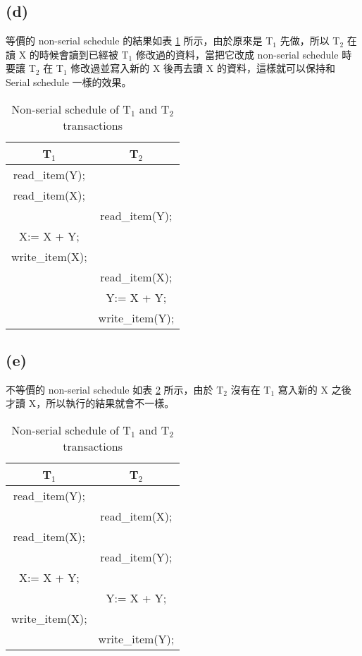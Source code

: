 \documentclass{article}
\begin{document}
\subsection*{(d)}
等價的 non-serial schedule 的結果如表 \ref{tab:2_d} 所示，由於原來是 T$_1$ 先做，所以 T$_2$ 在讀 X 的時候會讀到已經被 T$_1$ 修改過的資料，當把它改成 non-serial schedule 時要讓 T$_2$ 在 T$_1$ 修改過並寫入新的 X 後再去讀 X 的資料，這樣就可以保持和 Serial schedule 一樣的效果。
\begin{table}[H]
    \centering
    \begin{tabular}{|c|c|}
    \toprule
    \textbf{T$_1$} & \textbf{T$_2$} \\
    \midrule
    read\_item(Y); &  \\
    read\_item(X); & \\
     & read\_item(Y); \\
    X:= X + Y; &  \\
    write\_item(X); & \\
     & read\_item(X); \\
     & Y:= X + Y; \\
     & write\_item(Y); \\
    \bottomrule
    \end{tabular}
    \caption{Non-serial schedule of T$_1$ and T$_2$ transactions}
    \label{tab:2_d}
\end{table}


\subsection*{(e)}
不等價的 non-serial schedule 如表 \ref{tab:2_e} 所示，由於 T$_2$ 沒有在 T$_1$ 寫入新的 X 之後才讀 X，所以執行的結果就會不一樣。
\begin{table}[H]
    \centering
    \begin{tabular}{|c|c|}
    \toprule
    \textbf{T$_1$} & \textbf{T$_2$} \\
    \midrule
    read\_item(Y); &  \\
    & read\_item(X); \\
    read\_item(X); &  \\
    & read\_item(Y); \\
    X:= X + Y; &  \\
    & Y:= X + Y; \\
    write\_item(X); &  \\
    & write\_item(Y); \\
    \bottomrule
    \end{tabular}
    \caption{Non-serial schedule of T$_1$ and T$_2$ transactions}
    \label{tab:2_e}
\end{table}
\end{document}
